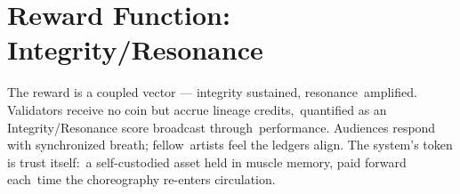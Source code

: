 \documentclass[12pt]{article}
\begin{document}
\section{Reward Function: Integrity/Resonance}
The reward is a coupled vector --- integrity sustained, resonance\
amplified. Validators receive no coin but accrue lineage credits,\
quantified as an Integrity/Resonance score broadcast through\
performance. Audiences respond with synchronized breath; fellow\
artists feel the ledgers align. The system's token is trust itself:\
a self-custodied asset held in muscle memory, paid forward each\
time the choreography re-enters circulation.
\end{document}
